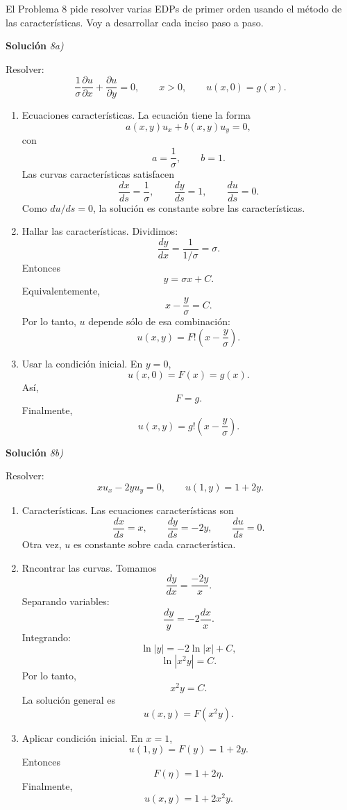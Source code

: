 \documentclass[11pt,spanish]{article}
\begin{document}
El Problema 8 pide resolver varias EDPs de primer orden usando el método de las características. 
Voy a desarrollar cada inciso paso a paso.

\vspace{0.5cm}
{\bf Soluci\'on }{\em 8a)}
\vspace{0.5cm}

Resolver:
$$
\frac1\sigma \frac{\partial u}{\partial x}+\frac{\partial u}{\partial y}=0,
\qquad x>0,
\qquad u(x,0)=g(x).
$$

\begin{enumerate}
\item Ecuaciones características.
La ecuación tiene la forma
$$
a(x,y)u_x+b(x,y)u_y=0,
$$
con
$$
a=\frac1\sigma,
\qquad
b=1.
$$
Las curvas características satisfacen
$$
\frac{dx}{ds}=\frac1\sigma,
\qquad
\frac{dy}{ds}=1,
\qquad
\frac{du}{ds}=0.
$$
Como $du/ds=0$, la solución es constante sobre las características.

\item Hallar las características.
Dividimos:
$$
\frac{dy}{dx}
=
\frac{1}{1/\sigma}
=
\sigma.
$$
Entonces
$$
y=\sigma x+C.
$$
Equivalentemente,
$$
x-\frac{y}{\sigma}=C.
$$
Por lo tanto, $u$ depende sólo de esa combinación:
$$
u(x,y)=F!\left(x-\frac{y}{\sigma}\right).
$$

\item Usar la condición inicial.
En $y=0$,
$$
u(x,0)=F(x)=g(x).
$$
Así,
$$
F=g.
$$
Finalmente,
$$
\boxed{
u(x,y)=g!\left(x-\frac{y}{\sigma}\right)
}.
$$
\end{enumerate}

\vspace{0.5cm}
{\bf Soluci\'on }{\em 8b)}
\vspace{0.5cm}

Resolver:
$$
x u_x-2y u_y=0,
\qquad
u(1,y)=1+2y.
$$

\begin{enumerate}
\item Características.
Las ecuaciones características son
$$
\frac{dx}{ds}=x,
\qquad
\frac{dy}{ds}=-2y,
\qquad
\frac{du}{ds}=0.
$$
Otra vez, $u$ es constante sobre cada característica.

\item Rncontrar las curvas.
Tomamos
$$
\frac{dy}{dx}
=
\frac{-2y}{x}.
$$
Separando variables:
$$
\frac{dy}{y}=-2\frac{dx}{x}.
$$
Integrando:
$$
\ln|y|=-2\ln|x|+C,
$$
$$
\ln|x^2y|=C.
$$
Por lo tanto,
$$
x^2y=C.
$$
La solución general es
$$
u(x,y)=F(x^2y).
$$

\item Aplicar condición inicial.
En $x=1$,
$$
u(1,y)=F(y)=1+2y.
$$
Entonces
$$
F(\eta)=1+2\eta.
$$
Finalmente,
$$
\boxed{
u(x,y)=1+2x^2y
}.
$$
\end{enumerate}
\end{document}
